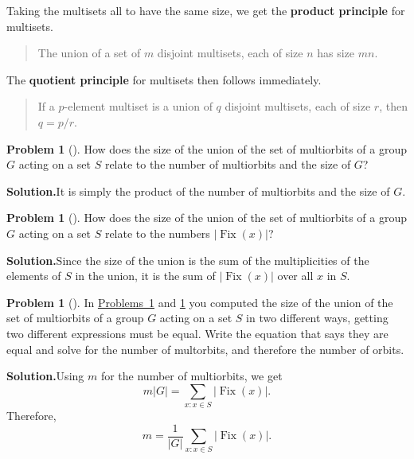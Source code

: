 \documentclass[10pt,]{book}
\newcommand{\terminology}[1]{\textbf{#1}}
\theoremstyle{plain}
\theoremstyle{definition}
\newtheorem{activity}[project]{Problem}
\theoremstyle{definition}
\numberwithin{equation}{chapter}
\DeclareMathOperator{\Fix}{Fix}
\begin{document}
Taking the multisets all to have the same size, we get the \terminology{product principle} for multisets.%
\begin{quote}\hypertarget{blockquote-15}{}
The union of a set of \(m\) disjoint multisets, each of size \(n\) has size \(mn\). %
\end{quote}
The \terminology{quotient principle} for multisets then follows immediately.%
\begin{quote}\hypertarget{blockquote-16}{}
If a \(p\)-element multiset is a union of \(q\) disjoint multisets, each of size \(r\), then \(q = p/r\).%
\end{quote}
\begin{activity}[]\label{union-multiorbit-size}
How does the size of the union of the set of multiorbits of a group \(G\) acting on a set \(S\) relate to the number of multiorbits and the size of \(G\)?%
\par\medskip\noindent%
\textbf{Solution.}\quad It is simply the product of the number of multiorbits and the size of \(G\).%
\end{activity}
\begin{activity}[]\label{union-multiorbit-fix}
How does the size of the union of the set of multiorbits of a group \(G\) acting on a set \(S\) relate to the numbers \(|\Fix(x)|\)?%
\par\medskip\noindent%
\textbf{Solution.}\quad Since the size of the union is the sum of the multiplicities of the elements of \(S\) in the union, it is the sum of \(|\Fix(x)|\) over all \(x\) in \(S\).%
\end{activity}
\begin{activity}[]\label{numbermultiorbits3}
In \hyperref[union-multiorbit-size]{Problems~\ref{union-multiorbit-size}} and \hyperref[union-multiorbit-fix]{\ref{union-multiorbit-fix}} you computed the size of the union of the set of multiorbits of a group \(G\) acting on a set \(S\) in two different ways, getting two different expressions must be equal. Write the equation that says they are equal and solve for the number of multorbits, and therefore the number of orbits.%
\par\medskip\noindent%
\textbf{Solution.}\quad Using \(m\) for the number of multiorbits, we get%
\begin{equation*}
m|G| = \sum_{x\colon x\in S}|\Fix(x)|\text{.}
\end{equation*}
Therefore,%
\begin{equation*}
m= \frac{1}{|G|} \sum_{x\colon x\in S}|\Fix(x)|\text{.}
\end{equation*}
%
\end{activity}
\typeout{************************************************}
\typeout{************************************************}
\end{document}
